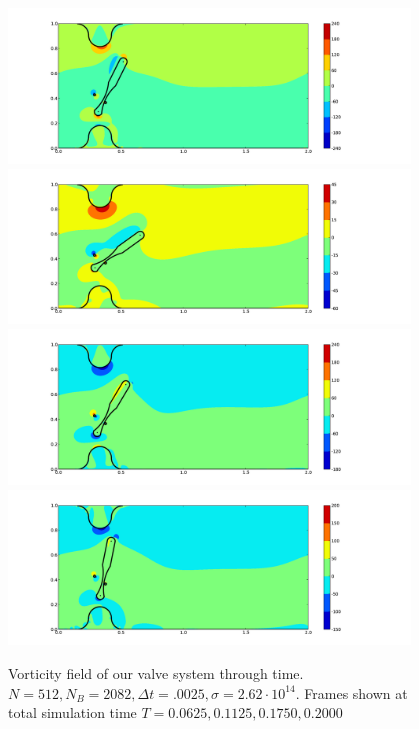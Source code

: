 \documentclass[preprint,12pt]{elsarticle}
\begin{document}
\begin{figure}[p]
\begin{center}
\includegraphics[bb=1.3in .5in 13.5in 6in,width=4.2in,clip]{fig_c25_n512.pdf}
\hfill
\includegraphics[bb=1.3in .5in 13.5in 6in,width=4.2in,clip]{fig_c45_n512.pdf}
\hfill
\includegraphics[bb=1.3in .5in 13.5in 6.3in,width=4.2in,clip]{fig_c70_n512.pdf}
\hfill
\includegraphics[bb=1.3in .5in 13.5in 6.5in,width=4.2in,clip]{fig_c80_n512.pdf}
\end{center}
\caption{\small Vorticity field of our valve system through time. $N=512,N_B=2082,\Delta t=.0025,\sigma=2.62\cdot 10^{14}$. Frames shown at total simulation time $T=0.0625,0.1125,0.1750,0.2000$}
\label{fig:TimeProgression}
\end{figure}
\end{document}
